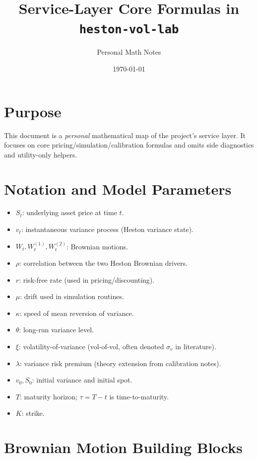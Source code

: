 \documentclass[11pt]{article}
\title{Service-Layer Core Formulas in \texttt{heston-vol-lab}}
\author{Personal Math Notes}
\date{\today}
\begin{document}
\maketitle

\section*{Purpose}
This document is a \emph{personal} mathematical map of the project's service layer.  
It focuses on core pricing/simulation/calibration formulas and omits side diagnostics and utility-only helpers.

\tableofcontents

\section{Notation and Model Parameters}
\begin{itemize}[leftmargin=2em]
    \item $S_t$: underlying asset price at time $t$.
    \item $v_t$: instantaneous variance process (Heston variance state).
    \item $W_t, W_t^{(1)}, W_t^{(2)}$: Brownian motions.
    \item $\rho$: correlation between the two Heston Brownian drivers.
    \item $r$: risk-free rate (used in pricing/discounting).
    \item $\mu$: drift used in simulation routines.
    \item $\kappa$: speed of mean reversion of variance.
    \item $\theta$: long-run variance level.
    \item $\xi$: volatility-of-variance (vol-of-vol, often denoted $\sigma_v$ in literature).
    \item $\lambda$: variance risk premium (theory extension from calibration notes).
    \item $v_0, S_0$: initial variance and initial spot.
    \item $T$: maturity horizon; $\tau=T-t$ is time-to-maturity.
    \item $K$: strike.
\end{itemize}

\section{Brownian Motion Building Blocks}
\end{document}
